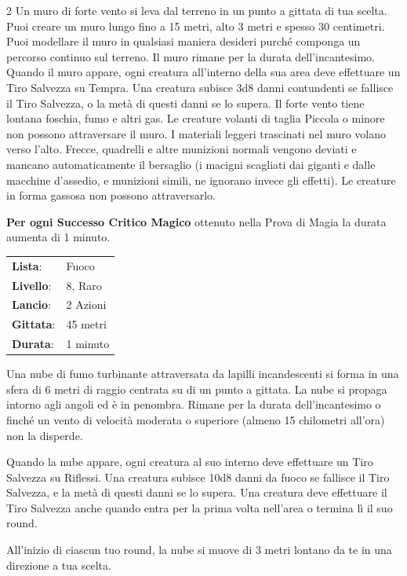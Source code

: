 \begin{multicols}{2}
Un muro di forte vento si leva dal terreno in un punto a gittata di tua scelta. Puoi creare un muro lungo fino a 15 metri, alto 3 metri e spesso 30 centimetri. Puoi modellare il muro in qualsiasi maniera desideri purché componga un percorso continuo sul terreno. Il muro rimane per la durata dell'incantesimo. Quando il muro appare, ogni creatura all'interno della sua area deve effettuare un Tiro Salvezza su Tempra. Una creatura subisce 3d8 danni contundenti se fallisce il Tiro Salvezza, o la metà di questi danni se lo supera. Il forte vento tiene lontana foschia, fumo e altri gas. Le creature volanti di taglia Piccola o minore non possono attraversare il muro. I materiali leggeri trascinati nel muro volano verso l'alto. Frecce, quadrelli e altre munizioni normali vengono deviati e mancano automaticamente il bersaglio (i macigni scagliati dai giganti e dalle macchine d'assedio, e munizioni simili, ne ignorano invece gli effetti). Le creature in forma gassosa non possono attraversarlo.

\textbf{Per ogni Successo Critico Magico} ottenuto nella Prova di Magia la durata aumenta di 1 minuto.

\noindent\begin{tabularx}{\linewidth}{p{1.9cm}X}
	\rowcolor{gray!20}\textbf{Lista}: & Fuoco \\
	\textbf{Livello}: & 8, Raro \\
	\rowcolor{gray!20}\textbf{Lancio}: & 2 Azioni \\
	\textbf{Gittata}: & 45 metri \\
	\rowcolor{gray!20}\textbf{Durata}: & 1 minuto \\
\end{tabularx}\smallskip

Una nube di fumo turbinante attraversata da lapilli incandescenti si forma in una sfera di 6 metri di raggio centrata su di un punto a gittata. La nube si propaga intorno agli angoli ed è in penombra. Rimane per la durata dell'incantesimo o finché un vento di velocità moderata o superiore (almeno 15 chilometri all'ora) non la disperde.

Quando la nube appare, ogni creatura al suo interno deve effettuare un Tiro Salvezza su Riflessi. Una creatura subisce 10d8 danni da fuoco se fallisce il Tiro Salvezza, e la metà di questi danni se lo supera. Una creatura deve effettuare il Tiro Salvezza anche quando entra per la prima volta nell'area o termina lì il suo round.

All'inizio di ciascun tuo round, la nube si muove di 3 metri lontano da te in una direzione a tua scelta.


\end{multicols}
